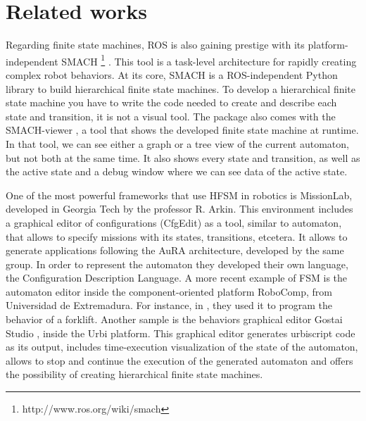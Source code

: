 \documentclass[journal,twoside]{JoPhA}
\begin{document}
\section{Related works}
Regarding  finite  state  machines,  ROS  is  also  gaining prestige with its platform-independent SMACH \footnote{http://www.ros.org/wiki/smach} \cite{boren2010,bohren2011}. This tool is a task-level architecture for rapidly creating complex robot behaviors. At its core, SMACH is a ROS-independent Python library to build hierarchical finite state machines. To develop a hierarchical finite state machine you have to write the code needed to create and describe each state and transition, it is not a visual tool. The package also comes with the SMACH-viewer %
, a tool that shows the developed finite state machine at runtime. In that tool, we can see either a graph or a tree view of the current automaton, but not both at the same time. It also shows every state and transition, as well as the active state and a debug window where we can see data of the active state.


One of the most powerful frameworks that use HFSM in robotics is MissionLab, developed in Georgia Tech by the professor R. Arkin. This environment includes a graphical editor of  configurations  (CfgEdit) \cite{mackenzie1998} as a tool, similar to  automaton,  that  allows  to  specify  missions  with  its states, transitions, etcetera. It allows to generate applications following the AuRA architecture, developed by the same group. In order to represent the automaton they developed their own language, the Configuration Description Language. A more recent example of FSM is the automaton editor inside the component-oriented platform RoboComp, from Universidad de Extremadura. For instance, in \cite{cintas2011}, they used it to program the behavior of a forklift. Another sample is the behaviors graphical editor Gostai Studio \cite{gostai2012}, inside the Urbi platform. This graphical editor generates urbiscript code as its output, includes time-execution visualization of the state of the automaton, allows to stop and continue the execution of the generated automaton and offers the possibility of creating hierarchical finite state machines.
\end{document}
